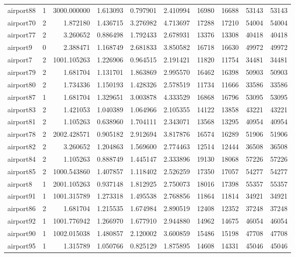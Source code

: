 \begin{longtable}{|l|r|r|r|r|r|r|r|r|r|}
airport88 & 1 & 3000.000000 & 1.613093 & 0.797901 & 2.410994 & 16980 & 16688 & 53143 & 53143 \\
airport70 & 2 & 1.872180 & 1.436715 & 3.276982 & 4.713697 & 17288 & 17210 & 54004 & 54004 \\
airport77 & 2 & 3.260652 & 0.886498 & 1.792433 & 2.678931 & 13376 & 13308 & 40418 & 40418 \\
airport9 & 0 & 2.388471 & 1.168749 & 2.681833 & 3.850582 & 16718 & 16630 & 49972 & 49972 \\
airport7 & 2 & 1001.105263 & 1.226906 & 0.964515 & 2.191421 & 11820 & 11754 & 34481 & 34481 \\
airport79 & 2 & 1.681704 & 1.131701 & 1.863869 & 2.995570 & 16462 & 16398 & 50903 & 50903 \\
airport80 & 2 & 1.734336 & 1.150193 & 1.428326 & 2.578519 & 11734 & 11666 & 33586 & 33586 \\
airport87 & 1 & 1.681704 & 1.329651 & 3.003878 & 4.333529 & 16868 & 16796 & 53095 & 53095 \\
airport83 & 2 & 1.421053 & 1.040389 & 1.064966 & 2.105355 & 14122 & 13858 & 43221 & 43221 \\
airport81 & 2 & 1.105263 & 0.638960 & 1.704111 & 2.343071 & 13568 & 13295 & 40954 & 40954 \\
airport78 & 2 & 2002.428571 & 0.905182 & 2.912694 & 3.817876 & 16574 & 16289 & 51906 & 51906 \\
airport82 & 2 & 3.260652 & 1.204863 & 1.569600 & 2.774463 & 12514 & 12444 & 36508 & 36508 \\
airport84 & 2 & 1.105263 & 0.888749 & 1.445147 & 2.333896 & 19130 & 18068 & 57226 & 57226 \\
airport85 & 2 & 1000.543860 & 1.407857 & 1.118402 & 2.526259 & 17350 & 17057 & 54277 & 54277 \\
airport8 & 1 & 2001.105263 & 0.937148 & 1.812925 & 2.750073 & 18016 & 17398 & 55357 & 55357 \\
airport91 & 1 & 1001.315789 & 1.273318 & 1.495538 & 2.768856 & 11864 & 11814 & 34921 & 34921 \\
airport86 & 2 & 1.681704 & 1.215535 & 1.674984 & 2.890519 & 12408 & 12352 & 37248 & 37248 \\
airport92 & 1 & 1001.776942 & 1.266970 & 1.677910 & 2.944880 & 14962 & 14675 & 46054 & 46054 \\
airport90 & 1 & 1002.015038 & 1.480857 & 2.120002 & 3.600859 & 15486 & 15198 & 47708 & 47708 \\
airport95 & 1 & 1.315789 & 1.050766 & 0.825129 & 1.875895 & 14608 & 14331 & 45046 & 45046 \\

\end{longtable}
